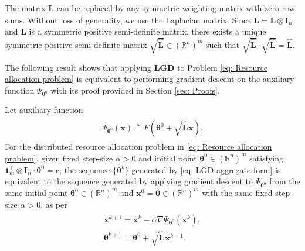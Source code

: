 \documentclass{siamart251216}
\begin{document}
\begin{remark}
    The matrix $\mathbf{L}$ can be replaced by any symmetric weighting matrix with zero row sums. Without loss of generality, we use the Laplacian matrix. Since $\hat{\mathbf{L}} = \mathbf{L}\otimes \mathbf{I}_{n}$ and $\mathbf{L}$ is a symmetric positive semi-definite matrix, there exists a unique symmetric positive semi-definite matrix $\sqrt{\hat{\mathbf{L}}} \in (\mathbb{R}^{n})^{m}$ such that $\sqrt{\hat{\mathbf{L}}} \cdot \sqrt{\hat{\mathbf{L}}} = \hat{\mathbf{L}}$. 
\end{remark}

The following result shows that applying \textbf{LGD} to Problem \eqref{eq: Resource allocation problem} is equivalent to performing gradient descent on the auxiliary function $\Psi_{\boldsymbol{\theta}^{0}}$ with its proof provided in Section \ref{sec: Proofs}.
\begin{proposition}
\label{pro: Same sequence}
    Let auxiliary function
    \begin{gather}
        \begin{gathered}
            \label{eq: Auxiliary function}
            \Psi_{\boldsymbol{\theta}^{0}}(\mathbf{x}) \triangleq F(\boldsymbol{\theta}^{0} + \sqrt{\hat{\mathbf{L}}} \mathbf{x}).
        \end{gathered}    
    \end{gather}
    For the distributed resource allocation problem in \eqref{eq: Resource allocation problem}, given fixed step-size $\alpha > 0$ and initial point $\boldsymbol{\theta}^{0} \in (\mathbb{R}^{n})^{m}$ satisfying $\bm{1}_{m}^{\top} \otimes \mathbf{I}_{n} \cdot \boldsymbol{\theta}^{0} = \bm{r}$, the sequence $\{\boldsymbol{\theta}^{k}\}$ generated by \eqref{eq: LGD aggregate form} is equivalent to the sequence generated by applying gradient descent to $\Psi_{\boldsymbol{\theta}^{0}}$ from the same initial point $\boldsymbol{\theta}^{0} \in (\mathbb{R}^{n})^{m}$ and $\mathbf{x}^{0} = \bm{0} \in (\mathbb{R}^{n})^{m}$ with the same fixed step-size $\alpha > 0$, as per
    \begin{gather}
    \label{eq: LGD with auxiliary function}
        \begin{gathered}
            \mathbf{x}^{k+1} = \mathbf{x}^{k} - \alpha \nabla \Psi_{\boldsymbol{\theta}^{0}}(\mathbf{x}^{k}),\\
            \boldsymbol{\theta}^{k+1} = \boldsymbol{\theta}^{0} + \sqrt{\hat{\mathbf{L}}} \mathbf{x}^{k+1}.
        \end{gathered}
    \end{gather}
\end{proposition}
\end{document}
